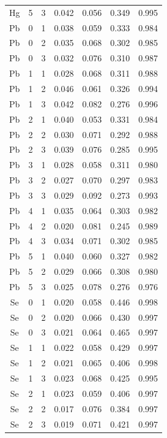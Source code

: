 \documentclass[ms, hidelinks]{uncgdissertationexp}
\theoremstyle{plain}
\theoremstyle{definition}
\theoremstyle{remark}
\begin{document}
\begin{longtable}{ccccccc}
Hg & 5 & 3 & 0.042 & 0.056 & 0.349 & 0.995\\
\rowcolor{gray!6}  Pb & 0 & 1 & 0.038 & 0.059 & 0.333 & 0.984\\
Pb & 0 & 2 & 0.035 & 0.068 & 0.302 & 0.985\\
\rowcolor{gray!6}  Pb & 0 & 3 & 0.032 & 0.076 & 0.310 & 0.987\\
Pb & 1 & 1 & 0.028 & 0.068 & 0.311 & 0.988\\
\rowcolor{gray!6}  Pb & 1 & 2 & 0.046 & 0.061 & 0.326 & 0.994\\
Pb & 1 & 3 & 0.042 & 0.082 & 0.276 & 0.996\\
\rowcolor{gray!6}  Pb & 2 & 1 & 0.040 & 0.053 & 0.331 & 0.984\\
Pb & 2 & 2 & 0.030 & 0.071 & 0.292 & 0.988\\
\rowcolor{gray!6}  Pb & 2 & 3 & 0.039 & 0.076 & 0.285 & 0.995\\
Pb & 3 & 1 & 0.028 & 0.058 & 0.311 & 0.980\\
\rowcolor{gray!6}  Pb & 3 & 2 & 0.027 & 0.070 & 0.297 & 0.983\\
Pb & 3 & 3 & 0.029 & 0.092 & 0.273 & 0.993\\
\rowcolor{gray!6}  Pb & 4 & 1 & 0.035 & 0.064 & 0.303 & 0.982\\
Pb & 4 & 2 & 0.020 & 0.081 & 0.245 & 0.989\\
\rowcolor{gray!6}  Pb & 4 & 3 & 0.034 & 0.071 & 0.302 & 0.985\\
Pb & 5 & 1 & 0.040 & 0.060 & 0.327 & 0.982\\
\rowcolor{gray!6}  Pb & 5 & 2 & 0.029 & 0.066 & 0.308 & 0.980\\
Pb & 5 & 3 & 0.025 & 0.078 & 0.276 & 0.976\\
\rowcolor{gray!6}  Se & 0 & 1 & 0.020 & 0.058 & 0.446 & 0.998\\
Se & 0 & 2 & 0.020 & 0.066 & 0.430 & 0.997\\
\rowcolor{gray!6}  Se & 0 & 3 & 0.021 & 0.064 & 0.465 & 0.997\\
Se & 1 & 1 & 0.022 & 0.058 & 0.429 & 0.997\\
\rowcolor{gray!6}  Se & 1 & 2 & 0.021 & 0.065 & 0.406 & 0.998\\
Se & 1 & 3 & 0.023 & 0.068 & 0.425 & 0.995\\
\rowcolor{gray!6}  Se & 2 & 1 & 0.023 & 0.059 & 0.406 & 0.997\\
Se & 2 & 2 & 0.017 & 0.076 & 0.384 & 0.997\\
\rowcolor{gray!6}  Se & 2 & 3 & 0.019 & 0.071 & 0.421 & 0.997\\

\end{longtable}
\end{document}
